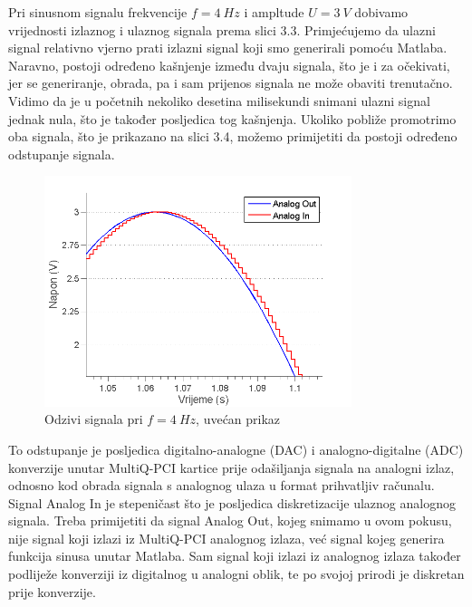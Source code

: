 \documentclass[12pt,a4paper]{article}
\begin{document}
Pri sinusnom signalu frekvencije $f=4\ Hz$ i ampltude $U=3\ V$ dobivamo vrijednosti izlaznog i ulaznog signala prema slici 3.3. Primjećujemo da ulazni signal relativno vjerno prati izlazni signal koji smo generirali pomoću Matlaba. Naravno, postoji određeno kašnjenje između dvaju signala, što je i za očekivati, jer se generiranje, obrada, pa i sam prijenos signala ne može obaviti trenutačno. Vidimo da je u početnih nekoliko desetina milisekundi snimani ulazni signal jednak nula, što je također posljedica tog kašnjenja. Ukoliko pobliže promotrimo oba signala, što je prikazano na slici 3.4, možemo primijetiti da postoji određeno odstupanje signala.

\begin{figure}[h]
	\begin{center}
	\includegraphics[width=0.8\textwidth] {prvi4closer.png}
    \caption{Odzivi signala pri $f=4\ Hz$, uvećan prikaz}
    \end{center}
\end{figure}

\newpage
To odstupanje je posljedica digitalno-analogne (DAC) i analogno-digitalne (ADC) konverzije unutar MultiQ-PCI kartice prije odašiljanja signala na analogni izlaz, odnosno kod obrada signala s analognog ulaza u format prihvatljiv računalu. Signal Analog In je stepeničast što je posljedica diskretizacije ulaznog analognog signala. Treba primijetiti da signal Analog Out, kojeg snimamo u ovom pokusu, nije signal koji izlazi iz MultiQ-PCI analognog izlaza, već signal kojeg generira funkcija sinusa unutar Matlaba. Sam signal koji izlazi iz analognog izlaza također podliježe konverziji iz digitalnog u analogni oblik, te po svojoj prirodi je diskretan prije konverzije.\newline
\end{document}
